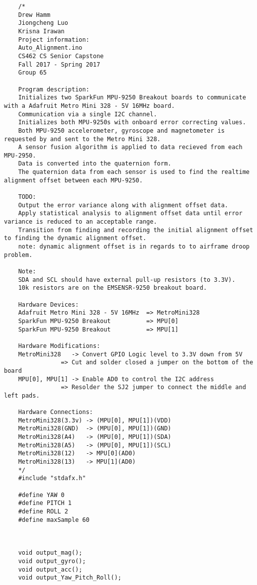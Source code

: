 	\begin{lstlisting}
	/*
	Drew Hamm
	Jiongcheng Luo
	Krisna Irawan
	Project information:
	Auto_Alignment.ino
	CS462 CS Senior Capstone
	Fall 2017 - Spring 2017
	Group 65

	Program description:
	Initializes two SparkFun MPU-9250 Breakout boards to communicate with a Adafruit Metro Mini 328 - 5V 16MHz board.
	Communication via a single I2C channel.
	Initializes both MPU-9250s with onboard error correcting values.
	Both MPU-9250 accelerometer, gyroscope and magnetometer is requested by and sent to the Metro Mini 328.
	A sensor fusion algorithm is applied to data recieved from each MPU-2950.
	Data is converted into the quaternion form.
	The quaternion data from each sensor is used to find the realtime alignment offset between each MPU-9250.

	TODO:
	Output the error variance along with alignment offset data.
	Apply statistical analysis to alignment offset data until error variance is reduced to an acceptable range.
	Transition from finding and recording the initial alignment offset to finding the dynamic alignment offset.
	note: dynamic alignment offset is in regards to to airframe droop problem.

	Note:
	SDA and SCL should have external pull-up resistors (to 3.3V).
	10k resistors are on the EMSENSR-9250 breakout board.

	Hardware Devices:
	Adafruit Metro Mini 328 - 5V 16MHz  => MetroMini328
	SparkFun MPU-9250 Breakout          => MPU[0]
	SparkFun MPU-9250 Breakout          => MPU[1]

	Hardware Modifications:
	MetroMini328   -> Convert GPIO Logic level to 3.3V down from 5V
	            => Cut and solder closed a jumper on the bottom of the board
	MPU[0], MPU[1] -> Enable AD0 to control the I2C address
	            => Resolder the SJ2 jumper to connect the middle and left pads.

	Hardware Connections:
	MetroMini328(3.3v) -> (MPU[0], MPU[1])(VDD)
	MetroMini328(GND)  -> (MPU[0], MPU[1])(GND)
	MetroMini328(A4)   -> (MPU[0], MPU[1])(SDA)
	MetroMini328(A5)   -> (MPU[0], MPU[1])(SCL)
	MetroMini328(12)   -> MPU[0](AD0)
	MetroMini328(13)   -> MPU[1](AD0)
	*/
	#include "stdafx.h"

	#define YAW 0
	#define PITCH 1
	#define ROLL 2
	#define maxSample 60



	void output_mag();
	void output_gyro();
	void output_acc();
	void output_Yaw_Pitch_Roll();



\end{lstlisting}
